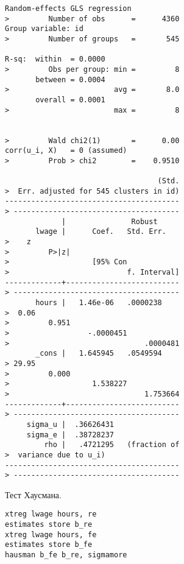 \documentclass[]{article}
\begin{document}
\begin{verbatim}
Random-effects GLS regression           
>         Number of obs      =      4360
Group variable: id                      
>         Number of groups   =       545

R-sq:  within  = 0.0000                 
>         Obs per group: min =         8
       between = 0.0004                 
>                        avg =       8.0
       overall = 0.0001                 
>                        max =         8

                                        
>         Wald chi2(1)       =      0.00
corr(u_i, X)   = 0 (assumed)            
>         Prob > chi2        =    0.9510

                                   (Std.
>  Err. adjusted for 545 clusters in id)
----------------------------------------
> --------------------------------------
             |               Robust
       lwage |      Coef.   Std. Err.   
>    z                                  
>         P>|z|                         
>                   [95% Con            
>                           f. Interval]
-------------+--------------------------
> --------------------------------------
       hours |   1.46e-06   .0000238    
>  0.06                                 
>         0.951                         
>                  -.0000451            
>                               .0000481
       _cons |   1.645945   .0549594    
> 29.95                                 
>         0.000                         
>                   1.538227            
>                               1.753664
-------------+--------------------------
> --------------------------------------
     sigma_u |  .36626431
     sigma_e |  .38728237
         rho |   .4721295   (fraction of
>  variance due to u_i)
----------------------------------------
> --------------------------------------
\end{verbatim}

Тест Хаусмана.

\begin{verbatim}
xtreg lwage hours, re
estimates store b_re
xtreg lwage hours, fe
estimates store b_fe
hausman b_fe b_re, sigmamore
\end{verbatim}
\end{document}
